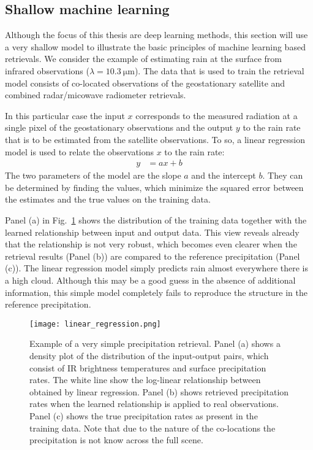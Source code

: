 \subsection{Shallow machine learning}

Although the focus of this thesis are deep learning methods, this section will
use a very shallow model to illustrate the basic principles of machine learning
based retrievals. We consider the example of estimating rain at the surface from
infrared observations ($\lambda = \SI{10.3}{\micro \meter}$). The data that is
used to train the retrieval model consists of co-located observations of the
geostationary satellite and combined radar/micowave radiometer retrievals.

In this particular case the input $x$ corresponds to the measured radiation at a
single pixel of the geostationary observations and the output $y$ to the rain rate
that is to be estimated from the satellite observations. To so, a linear regression
model is used to relate the observations $x$ to the rain rate:
\begin{align}
  y &= a x + b
\end{align}
The two parameters of the model are the slope $a$ and the intercept $b$.
They can be determined by finding the values, which minimize the
squared error between the estimates and the true values on the training data.

Panel (a) in Fig.~\ref{fig:machine_learning:linear_regression} shows the
distribution of the training data together with the learned relationship between
input and output data. This view reveals already that the relationship is not
very robust, which becomes even clearer when the retrieval results (Panel (b))
are compared to the reference precipitation (Panel (c)). The linear regression
model simply predicts rain almost everywhere there is a high cloud. Although
this may be a good guess in the absence of additional information, this simple
model completely fails to reproduce the structure in the reference
precipitation.

\begin{figure}
  \centering
  \texttt{[image: linear\_regression.png]}
  \caption{Example of a very simple precipitation retrieval. Panel (a) shows a density
    plot of the distribution of the input-output pairs, which consist of IR brightness
    temperatures and surface precipitation rates. The white line show the
    log-linear relationship between obtained by linear regression. Panel (b) shows
    retrieved precipitation rates when the learned relationship is applied to
    real observations. Panel (c) shows the true precipitation rates as present
    in the training data. Note that due to the nature of the co-locations the precipitation
    is not know across the full scene.
  }
  \label{fig:machine_learning:linear_regression}
\end{figure}

